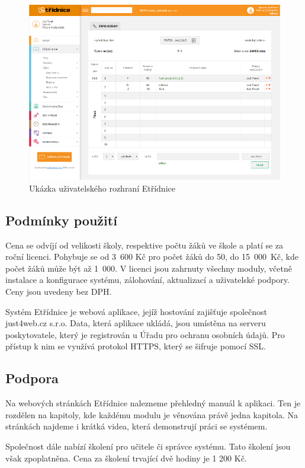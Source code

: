 \begin{figure}[h]
	\centering
	\includegraphics[width=\textwidth]{images/etridnice.png}
	\caption{Ukázka uživatelského rozhraní Etřídnice \cite{etridnice}}
	\label{etridnice}
\end{figure}

\subsection{Podmínky použití}
Cena se odvíjí od velikosti školy, respektive počtu žáků ve škole a platí se za roční licenci. Pohybuje se od 3~600 Kč pro počet žáků do 50, do 15~000~Kč, kde počet žáků může být až 1~000. V licenci jsou zahrnuty všechny moduly, včetně instalace a konfigurace systému, zálohování, aktualizací a uživatelské podpory. Ceny jsou uvedeny bez DPH. \cite{etridnice-cena} 

Systém Etřídnice je webová aplikace, jejíž hostování zajišťuje společnost just4web.cz s.r.o. Data, která aplikace ukládá, jsou umístěna na serveru poskytovatele, který je registrován u Úřadu pro ochranu osobních údajů. Pro přístup k nim se využívá protokol HTTPS, který se šifruje pomocí SSL. \cite{etridnice-podpora}

\subsection{Podpora}
Na webových stránkách Etřídnice nalezneme přehledný manuál k aplikaci. Ten je rozdělen na kapitoly, kde každému modulu je věnována právě jedna kapitola. Na stránkách najdeme i krátká videa, která demonstrují práci se systémem.

Společnost dále nabízí školení pro učitele či správce systému. Tato školení jsou však zpoplatněna. Cena za školení trvající dvě hodiny je 1 200 Kč.

